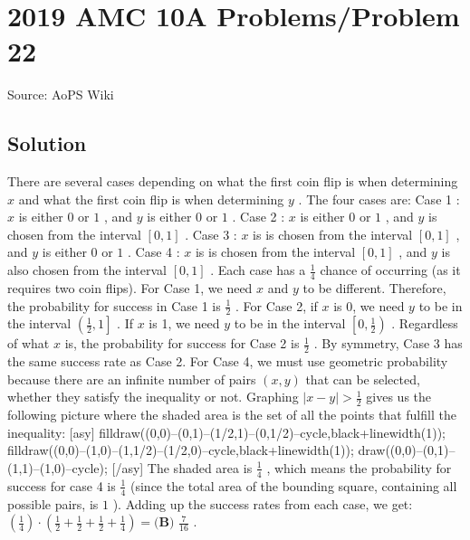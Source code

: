 \documentclass[12pt]{article}
\begin{document}
\section*{{2019 AMC 10A Problems/Problem 22}}
Source: AoPS Wiki

\subsection*{Solution}
There are several cases depending on what the first coin flip is when determining $x$ and what the first coin flip is when determining $y$ . The four cases are: Case 1 : $x$ is either $0$ or $1$ , and $y$ is either $0$ or $1$ . Case 2 : $x$ is either $0$ or $1$ , and $y$ is chosen from the interval $[0,1]$ . Case 3 : $x$ is is chosen from the interval $[0,1]$ , and $y$ is either $0$ or $1$ . Case 4 : $x$ is is chosen from the interval $[0,1]$ , and $y$ is also chosen from the interval $[0,1]$ . Each case has a $\frac{1}{4}$ chance of occurring (as it requires two coin flips). For Case 1, we need $x$ and $y$ to be different. Therefore, the probability for success in Case 1 is $\frac{1}{2}$ . For Case 2, if $x$ is 0, we need $y$ to be in the interval $\left(\frac{1}{2}, 1\right]$ . If $x$ is 1, we need $y$ to be in the interval $\left[0, \frac{1}{2}\right)$ . Regardless of what $x$ is, the probability for success for Case 2 is $\frac{1}{2}$ . By symmetry, Case 3 has the same success rate as Case 2. For Case 4, we must use geometric probability because there are an infinite number of pairs $(x, y)$ that can be selected, whether they satisfy the inequality or not. Graphing $|x-y| > \tfrac{1}{2}$ gives us the following picture where the shaded area is the set of all the points that fulfill the inequality: [asy] filldraw((0,0)--(0,1)--(1/2,1)--(0,1/2)--cycle,black+linewidth(1)); filldraw((0,0)--(1,0)--(1,1/2)--(1/2,0)--cycle,black+linewidth(1)); draw((0,0)--(0,1)--(1,1)--(1,0)--cycle); [/asy] The shaded area is $\frac{1}{4}$ , which means the probability for success for case 4 is $\frac{1}{4}$ (since the total area of the bounding square, containing all possible pairs, is $1$ ). Adding up the success rates from each case, we get: $\left(\frac{1}{4}\right) \cdot \left(\frac{1}{2} + \frac{1}{2} + \frac{1}{2} + \frac{1}{4}\right) = \boxed{\textbf{(B) }\frac{7}{16}}$ .
\end{document}
